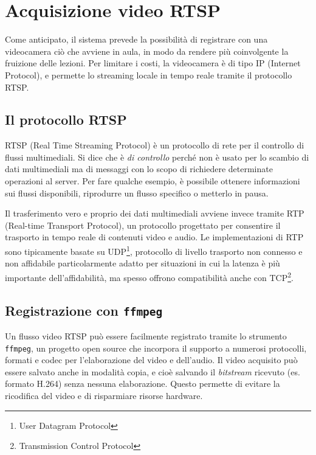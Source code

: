 \chapter{Acquisizione video RTSP}
\label{cha:rtsp}

Come anticipato, il sistema prevede la possibilità di registrare con una videocamera ciò che avviene in aula, in modo da rendere più coinvolgente la fruizione delle lezioni. Per limitare i costi, la videocamera è di tipo IP (Internet Protocol), e permette lo streaming locale in tempo reale tramite il protocollo RTSP.

\section{Il protocollo RTSP}
\label{sec:rtsp_protocollo}

RTSP (Real Time Streaming Protocol) è un protocollo di rete per il controllo di flussi multimediali. Si dice che è \emph{di controllo} perché non è usato per lo scambio di dati multimediali ma di messaggi con lo scopo di richiedere determinate operazioni al server. Per fare qualche esempio, è possibile ottenere informazioni sui flussi disponibili, riprodurre un flusso specifico o metterlo in pausa.\cite{rfc2326}

Il trasferimento vero e proprio dei dati multimediali avviene invece tramite RTP (Real-time Transport Protocol), un protocollo progettato per consentire il trasporto in tempo reale di contenuti video e audio. Le implementazioni di RTP sono tipicamente basate su UDP\footnote{User Datagram Protocol}, protocollo di livello trasporto non connesso e non affidabile particolarmente adatto per situazioni in cui la latenza è più importante dell'affidabilità, ma spesso offrono compatibilità anche con TCP\footnote{Transmission Control Protocol}.

\section{Registrazione con \texttt{ffmpeg}}
\label{sec:rtsp_ffmpeg}

Un flusso video RTSP può essere facilmente registrato tramite lo strumento \texttt{ffmpeg}, un progetto open source che incorpora il supporto a numerosi protocolli, formati e codec per l'elaborazione del video e dell'audio. Il video acquisito può essere salvato anche in modalità copia, e cioè salvando il \emph{bitstream} ricevuto (es. formato H.264) senza nessuna elaborazione. Questo permette di evitare la ricodifica del video e di risparmiare risorse hardware.


